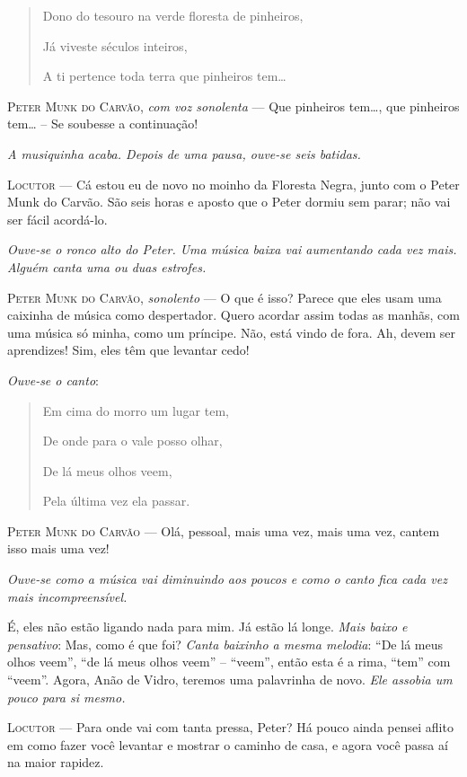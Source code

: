 \begin{quote}
Dono do tesouro na verde floresta de pinheiros,

Já viveste séculos inteiros,

A ti pertence toda terra que pinheiros tem\ldots{}
\end{quote}

\textsc{Peter Munk do Carvão}, \emph{com voz sonolenta} --- Que pinheiros
tem\ldots{}, que pinheiros tem\ldots{} -- Se soubesse a continuação!

\emph{A musiquinha acaba. Depois de uma pausa, ouve-se seis batidas.}

\textsc{Locutor} --- Cá estou eu de novo no moinho da Floresta Negra, junto com o
Peter Munk do Carvão. São seis horas e aposto que o Peter dormiu sem
parar; não vai ser fácil acordá-lo.

\emph{Ouve-se o ronco alto do Peter. Uma música baixa vai aumentando
cada vez mais. Alguém canta uma ou duas estrofes.}

\textsc{Peter Munk do Carvão}, \emph{sonolento} --- O que é isso? Parece que eles
usam uma caixinha de música como despertador. Quero acordar assim todas
as manhãs, com uma música só minha, como um príncipe. Não, está vindo de
fora. Ah, devem ser aprendizes! Sim, eles têm que levantar cedo!

\emph{Ouve-se o canto}:

\begin{quote}
Em cima do morro um lugar tem,

De onde para o vale posso olhar,

De lá meus olhos veem,

Pela última vez ela passar.
\end{quote}

\textsc{Peter Munk do Carvão} --- Olá, pessoal, mais uma vez, mais uma vez, cantem
isso mais uma vez!

\emph{Ouve-se como a música vai diminuindo aos poucos e como o canto
fica cada vez mais incompreensível.}

É, eles não estão ligando nada para mim. Já estão lá longe. \emph{Mais
baixo e pensativo}: Mas, como é que foi? \emph{Canta baixinho a mesma
melodia}: ``De lá meus olhos veem'', ``de lá meus olhos veem'' --
``veem'', então esta é a rima, ``tem'' com ``veem''. Agora, Anão de
Vidro, teremos uma palavrinha de novo. \emph{Ele assobia um pouco para
si mesmo.}

\textsc{Locutor} --- Para onde vai com tanta pressa, Peter? Há pouco ainda pensei
aflito em como fazer você levantar e mostrar o caminho de casa, e agora
você passa aí na maior rapidez.

